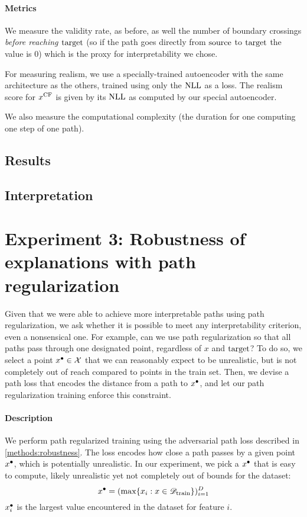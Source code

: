 \documentclass[../main.tex]{subfiles}
\begin{document}
\paragraph{Metrics}

We measure the validity rate, as before, as well the number of boundary crossings \emph{before reaching $\mathrm{target}$} (so if the path goes directly from $\mathrm{source}$ to $\mathrm{target}$ the value is 0) which is the proxy for interpretability we chose.

For measuring realism, we use a specially-trained autoencoder with the same architecture as the others, trained using only the $\text{NLL}$ as a loss.
The realism score for $x^\mathrm{CF}$ is given by its $\text{NLL}$ as computed by our special autoencoder.

We also measure the computational complexity (the duration for one computing one step of one path).

\subsection{Results}

\subsection{Interpretation}

\section{Experiment 3: Robustness of explanations with path regularization}

Given that we were able to achieve more interpretable paths using path regularization, we ask whether it is possible to meet any interpretability criterion, even a nonsensical one.
For example, can we use path regularization so that all paths pass through one designated point, regardless of $x$ and $\mathrm{target}$?
To do so, we select a point $x^\bullet \in \mathcal{X}$ that we can reasonably expect to be unrealistic, but is not completely out of reach compared to points in the train set.
Then, we devise a path loss that encodes the distance from a path to $x^\bullet$, and let our path regularization training enforce this constraint.

\paragraph{Description}

We perform path regularized training using the adversarial path loss described in \autoref{methods:robustness}.
The loss encodes how close a path passes by a given point $x^\bullet$, which is potentially unrealistic.
In our experiment, we pick a $x^\bullet$ that is easy to compute, likely unrealistic yet not completely out of bounds for the dataset:
\begin{equation}
    x^\bullet = (\max\{ x_i : x \in \mathscr{D}_\text{train} \})_{i=1}^D
\end{equation}
\ie{} $x^\bullet_i$ is the largest value encountered in the dataset for feature $i$.
\end{document}
